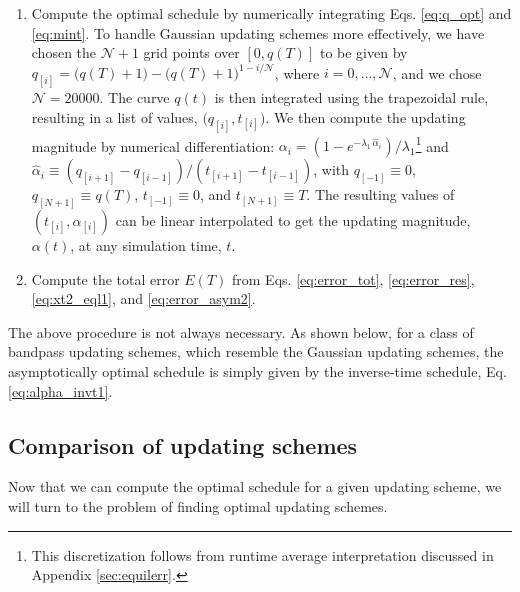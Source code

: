 \documentclass[reprint, superscriptaddress, floatfix]{revtex4-1}
\newcommand{\Err}{E}
\begin{document}
\begin{enumerate}
\item \label{step:alpha}
Compute the optimal schedule by
  numerically integrating Eqs. \eqref{eq:q_opt} and \eqref{eq:mint}.
%
To handle Gaussian updating schemes more effectively,
  we have chosen the $\mathcal N+1$ grid points over $[0, q(T)]$ to be given by
  $q_{[i]} = \bigl(q(T) + 1\bigr) - \bigl(q(T)+1\bigr)^{1-i/\mathcal N}$,
  where $i = 0, \dots, \mathcal N$, and we chose $\mathcal N=20000$.
%
The curve $q(t)$ is then integrated
  using the trapezoidal rule\cite{press3rd},
  resulting in a list of values, $\bigl(q_{[i]}, t_{[i]} \bigr)$.
%
We then compute the updating magnitude by numerical differentiation:
  $\alpha_i = (1 - e^{-\lambda_1 \, \hat \alpha_i})/\lambda_1$\footnote{This
    discretization follows from runtime average interpretation
    discussed in Appendix \ref{sec:equilerr}.}
  and
  $\hat \alpha_i \equiv (q_{[i+1]} - q_{[i-1]}) / (t_{[i+1]} - t_{[i-1]})$,
  with
  $q_{[ -1]} \equiv 0$,
  $q_{[N+1]} \equiv q(T)$,
  $t_{[ -1]} \equiv 0$, and
  $t_{[N+1]} \equiv T$.
%
The resulting values of $(t_{[i]}, \alpha_{[i]})$
  can be linear interpolated
  to get the updating magnitude, $\alpha(t)$, at any simulation time, $t$.


\item
  Compute the total error $\Err(T)$ from
Eqs. \eqref{eq:error_tot},
  \eqref{eq:error_res},
  \eqref{eq:xt2_eql1},
  and
  \eqref{eq:error_asym2}.

\end{enumerate}

The above procedure is not always necessary.
%
As shown below, for a class of bandpass updating schemes,
  which resemble the Gaussian updating schemes,
  the asymptotically optimal schedule
  is simply given by the inverse-time schedule, Eq. \eqref{eq:alpha_invt1}.
%



\subsection{\label{sec:cmpschemes}
Comparison of updating schemes}


Now that we can compute the optimal schedule
for a given updating scheme,
we will turn to the problem of finding
optimal updating schemes.
\end{document}
